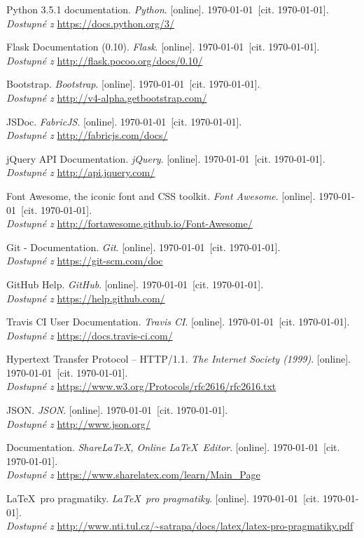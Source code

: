 \def\refname{Seznam použitých materiálů}


\newcommand{\wwwbibitem}[3]{%
	#1. \textit{#2}. [online]. \bibciteformat\today\ [cit. \today].\\
	\emph{Dostupné z} \href{#3}{#3}%
}

\begin{thebibliography}{00}
	\wwwbibitem{Python 3.5.1 documentation}{Python}{https://docs.python.org/3/}

	\wwwbibitem{Flask Documentation (0.10)}{Flask}{http://flask.pocoo.org/docs/0.10/}

	\wwwbibitem{Bootstrap}{Bootstrap}{http://v4-alpha.getbootstrap.com/}

	\wwwbibitem{JSDoc}{FabricJS}{http://fabricjs.com/docs/}

	\wwwbibitem{jQuery API Documentation}{jQuery}{http://api.jquery.com/}

	\wwwbibitem{Font Awesome, the iconic font and CSS toolkit}{Font Awesome}{http://fortawesome.github.io/Font-Awesome/}

	\wwwbibitem{Git - Documentation}{Git}{https://git-scm.com/doc}

	\wwwbibitem{GitHub Help}{GitHub}{https://help.github.com/}

	\wwwbibitem{Travis CI User Documentation}{Travis CI}{https://docs.travis-ci.com/}

	\wwwbibitem{Hypertext Transfer Protocol -- HTTP/1.1}{The Internet Society (1999)}{https://www.w3.org/Protocols/rfc2616/rfc2616.txt}

	\wwwbibitem{JSON}{JSON}{http://www.json.org/}

	\wwwbibitem{Documentation}{Share\LaTeX, Online \LaTeX\ Editor}{https://www.sharelatex.com/learn/Main\_Page}

	\wwwbibitem{\LaTeX\ pro pragmatiky}{\LaTeX\ pro pragmatiky}{http://www.nti.tul.cz/\textasciitilde{}satrapa/docs/latex/latex-pro-pragmatiky.pdf}
\end{thebibliography}
